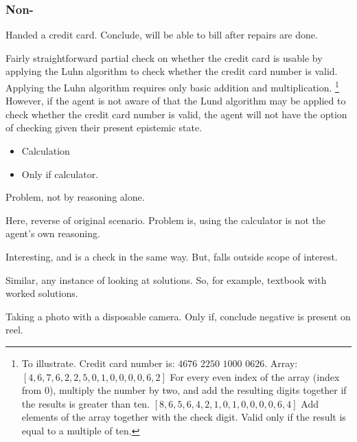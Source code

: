 \subsubsection{Non-}

\begin{note}
  \begin{scenario}
    \label{illu:number-check}
    Handed a credit card.
    Conclude, will be able to bill after repairs are done.
  \end{scenario}

  Fairly straightforward partial check on whether the credit card is usable by applying the Luhn algorithm to check whether the credit card number is valid.
  Applying the Luhn algorithm requires only basic addition and multiplication.%
  \footnote{
    To illustrate.
    Credit card number is:
    \(4676\) \(2250\) \(1000\) \(0626\).
    Array:
    \([4,6,7,6,2,2,5,0,1,0,0,0,0,6,2]\)
    For every even index of the array (index from \(0\)), multiply the number by two, and add the resulting digits together if the results is greater than ten.
    \([8,6,5,6,4,2,1,0,1,0,0,0,0,6,4]\)
    Add elements of the array together with the check digit.
    Valid only if the result is equal to a multiple of ten.
  }
  However, if the agent is not aware of that the Lund algorithm may be applied to check whether the credit card number is valid, the agent will not have the option of checking given their present epistemic state.
\end{note}

\begin{note}[Calculator B]
  \begin{scenario}[Calculator B]
    \mbox{}
    \vspace{-\baselineskip}
    \begin{itemize}
    \item
      Calculation
    \item
      Only if calculator.
    \end{itemize}
  \end{scenario}

  Problem, not by reasoning alone.

  Here, reverse of original scenario.
  Problem is, using the calculator is not the agent's own reasoning.

  Interesting, and is a check in the same way.
  But, falls outside scope of interest.

  Similar, any instance of looking at solutions.
  So, for example, textbook with worked solutions.

  Taking a photo with a disposable camera.
  Only if, conclude negative is present on reel.
\end{note}

